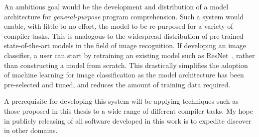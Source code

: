 An ambitious goal would be the development and distribution of a model architecture for \emph{general-purpose} program comprehension. Such a system would enable, with little to no effort, the model to be re-purposed for a variety of compiler tasks. This is analogous to the widespread distribution of pre-trained state-of-the-art models in the field of image recognition. If developing an image classifier, a user can start by retraining an existing model such as ResNet~\cite{He2016}, rather than constructing a model from scratch. This drastically simplifies the adoption of machine learning for image classification as the model architecture has been pre-selected and tuned, and reduces the amount of training data required.

A prerequisite for developing this system will be applying techniques such as those proposed in this thesis to a wide range of different compiler tasks. My hope in publicly releasing of all software developed in this work is to expedite discover in other domains.



